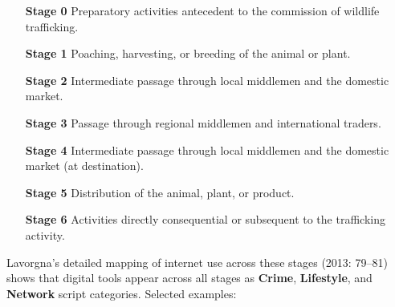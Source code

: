 \documentclass[11pt,a4paper,openany]{report}
\theoremstyle{definition}
\theoremstyle{plain}
\theoremstyle{remark}
\begin{document}
\begin{enumerate}
    \item[\textbf{Stage 0}] Preparatory activities antecedent to the commission of wildlife trafficking.
    \item[\textbf{Stage 1}] Poaching, harvesting, or breeding of the animal or plant.
    \item[\textbf{Stage 2}] Intermediate passage through local middlemen and the domestic market.
    \item[\textbf{Stage 3}] Passage through regional middlemen and international traders.
    \item[\textbf{Stage 4}] Intermediate passage through local middlemen and the domestic market (at destination).
    \item[\textbf{Stage 5}] Distribution of the animal, plant, or product.
    \item[\textbf{Stage 6}] Activities directly consequential or subsequent to the trafficking activity.
\end{enumerate}

Lavorgna's detailed mapping of internet use across these stages (2013: 79--81) shows that digital tools appear across all stages as \textbf{Crime}, \textbf{Lifestyle}, and \textbf{Network} script categories. Selected examples:
\end{document}
